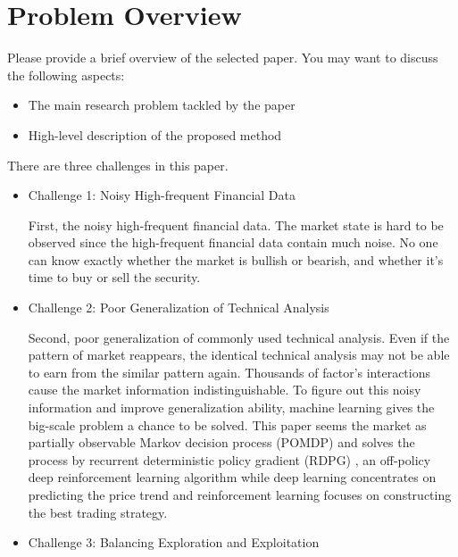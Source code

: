 \section{Problem Overview}
\label{section:intro} %

Please provide a brief overview of the selected paper. You may want to discuss the following aspects:
\begin{itemize}
    \item The main research problem tackled by the paper
    
    \item High-level description of the proposed method
\end{itemize}

There are three challenges in this paper. 
\begin{itemize}
\item Challenge 1: Noisy High-frequent Financial Data

First, the noisy high-frequent financial data. The market state is hard to be observed since the high-frequent financial data contain much noise. No one can know exactly whether the market is bullish or bearish, and whether it's time to buy or sell the security.

\item Challenge 2: Poor Generalization of Technical Analysis

Second, poor generalization of commonly used technical analysis. Even if the pattern of market reappears, the identical technical analysis may not be able to earn from the similar pattern again. Thousands of factor's interactions cause the market information indistinguishable.
To figure out this noisy information and improve generalization ability, machine learning gives the big-scale problem a chance to be solved. This paper seems the market as partially observable Markov decision process (POMDP) \citep{KAELBLING199899} and solves the process by recurrent deterministic policy gradient (RDPG) \citep{DBLP:journals/corr/HeessHLS15}, an off-policy deep reinforcement learning algorithm while deep learning concentrates on predicting the price trend and reinforcement learning focuses on constructing the best trading strategy.

\item Challenge 3: Balancing Exploration and Exploitation


\end{itemize}

